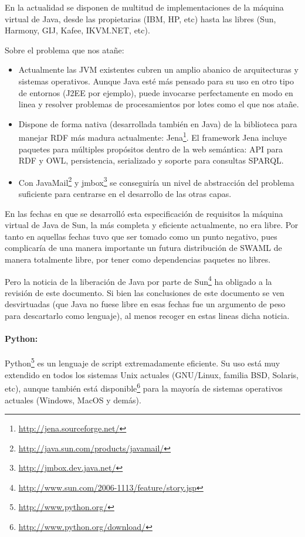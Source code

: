 En la actualidad se disponen de multitud de implementaciones de la máquina virtual
de Java, desde las propietarias (IBM, HP, etc) hasta las libres (Sun, Harmony, GIJ, 
Kafee, IKVM.NET, etc).

Sobre el problema que nos atañe:

\begin{itemize}
  \item Actualmente las JVM existentes cubren un amplio abanico de arquitecturas y 
	sistemas operativos. Aunque Java esté más pensado para su uso en otro tipo
	de entornos (J2EE por ejemplo), puede invocarse perfectamente en modo en
	linea y resolver problemas de procesamientos por lotes como el que nos
	atañe.
  \item Dispone de forma nativa (desarrollada también en Java) de la biblioteca para
	manejar RDF más madura actualmente: Jena\footnote{\url{http://jena.sourceforge.net/}}.
	El framework Jena incluye paquetes para múltiples propósitos dentro de la web
	semántica: API para RDF y OWL, persistencia, serializado y soporte para consultas
	SPARQL.
  \item Con JavaMail\footnote{\url{http://java.sun.com/products/javamail/}} y
	jmbox\footnote{\url{http://jmbox.dev.java.net/}} se conseguiría un nivel
	de abstracción del problema suficiente para centrarse en el desarrollo
	de las otras capas.
\end{itemize}

En las fechas en que se desarrolló esta especificación de requisitos la máquina virtual
de Java de Sun, la más completa y eficiente actualmente, no era libre. Por tanto en 
aquellas fechas tuvo que ser tomado como un punto negativo, pues complicaría de 
una manera importante un futura distribución de SWAML de manera totalmente libre,
por tener como dependencias paquetes no libres.

Pero la noticia de la liberación de Java por parte de Sun\footnote{\url{http://www.sun.com/2006-1113/feature/story.jsp}} ha obligado a la
revisión de este documento. Si bien las conclusiones de este documento se ven 
desvirtuadas (que Java no fuese libre en esas fechas fue un argumento de peso para
descartarlo como lenguaje), al menos recoger en estas lineas dicha noticia.

\paragraph{Python:}Python\footnote{\url{http://www.python.org/}} es un lenguaje de 
script extremadamente eficiente. Su uso está muy extendido en todos los sistemas 
Unix actuales (GNU/Linux, familia BSD, Solaris, etc), aunque también está disponible\footnote{\url{http://www.python.org/download/}} para la mayoría de sistemas 
operativos actuales (Windows, MacOS y demás).

